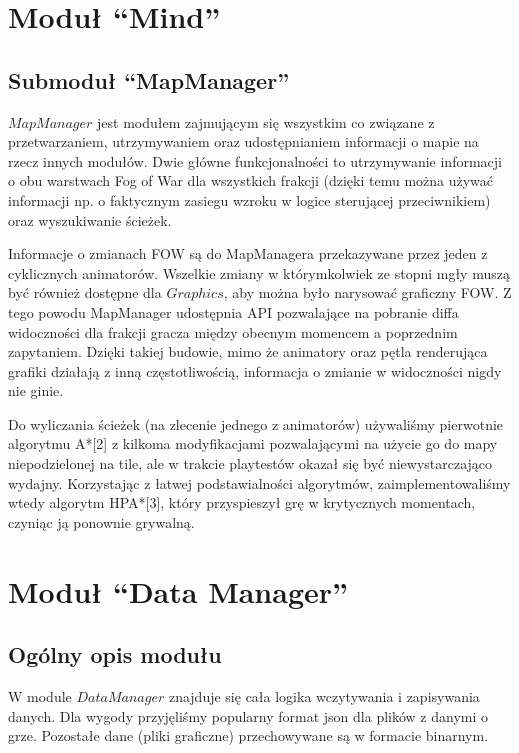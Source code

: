 \documentclass[licencjacka]{pracamgr}
\begin{document}
  \section{Moduł ``Mind''}
    \subsection{Submoduł ``MapManager''}
    $MapManager$ jest modułem zajmującym się wszystkim co związane z przetwarzaniem, utrzymywaniem oraz udostępnianiem
    informacji o mapie na rzecz innych modułów. Dwie główne funkcjonalności to utrzymywanie informacji o obu warstwach
    Fog of War dla wszystkich frakcji (dzięki temu można używać informacji np. o faktycznym zasiegu wzroku w logice
    sterującej przeciwnikiem) oraz wyszukiwanie ścieżek.

    Informacje o zmianach FOW są do MapManagera przekazywane przez jeden z cyklicznych animatorów. Wszelkie zmiany
    w którymkolwiek ze stopni mgły muszą być również dostępne dla $Graphics$, aby można było narysować graficzny FOW. Z
    tego powodu MapManager udostępnia API pozwalające na pobranie diffa widoczności dla frakcji gracza między obecnym
    momencem a poprzednim zapytaniem. Dzięki takiej budowie, mimo że animatory oraz pętla renderująca grafiki działają
    z inną częstotliwością, informacja o zmianie w widoczności nigdy nie ginie.

    Do wyliczania ścieżek (na zlecenie jednego z animatorów) używaliśmy pierwotnie algorytmu A*[2] z kilkoma
    modyfikacjami pozwalającymi na użycie go do mapy niepodzielonej na tile, ale w trakcie playtestów okazał się być
    niewystarczająco wydajny. Korzystając z łatwej podstawialności algorytmów, zaimplementowaliśmy wtedy algorytm
    HPA*[3], który przyspieszył grę w krytycznych momentach, czyniąc ją ponownie grywalną.

  \section{Moduł ``Data Manager''}
    \subsection{Ogólny opis modułu}
      W module $DataManager$ znajduje się cała logika wczytywania i zapisywania danych. Dla wygody przyjęliśmy
      popularny format json dla plików z danymi o grze. Pozostałe dane (pliki graficzne) przechowywane są w formacie
      binarnym.
\end{document}

